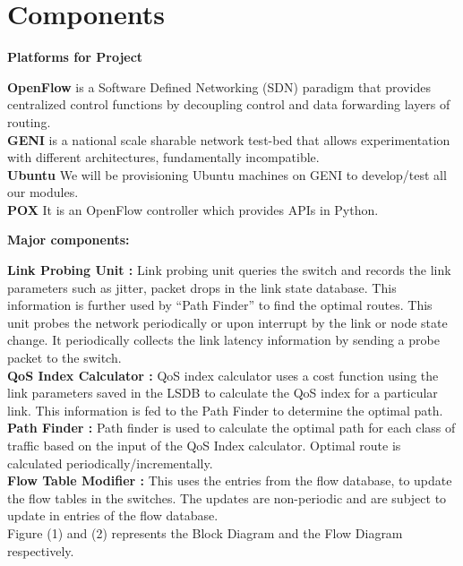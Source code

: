 \documentclass[12pt]{extarticle}
\begin{document}
\section*{Components}
{\large \textbf{Platforms for Project}}\\ 
\begin{flushleft}
\textbf{OpenFlow} is a Software Defined Networking (SDN) paradigm that provides centralized control functions by decoupling control and data forwarding layers of routing. \\
\vspace{2mm}
\textbf{GENI} is a national scale sharable network test-bed that allows experimentation with different architectures, fundamentally incompatible. \\
\vspace{2mm}
\textbf{Ubuntu} We will be provisioning Ubuntu machines on GENI to develop/test all our modules.\\
\vspace{2mm}
\textbf{POX} It is an OpenFlow controller which provides APIs in Python. \\

\end{flushleft}
\vspace{4mm}
{\large \textbf{Major components:}}\\
\begin{flushleft}
\textbf{Link Probing Unit : } Link probing unit queries the switch and records the link parameters such as jitter, packet drops in the link state database. This information is further used by “Path Finder” to find the optimal routes. This unit probes the network periodically or upon interrupt by the link or node state change. It periodically collects the link latency information by sending a probe packet to the switch.\\
\vspace{2mm}
\textbf{QoS Index Calculator :} QoS index calculator uses a cost function using the link parameters saved in the LSDB to calculate the QoS index for a particular link. This information is fed to the Path Finder to determine the optimal path.\\
\vspace{2mm}
\textbf{Path Finder :} Path finder is used to calculate the optimal path for each class of traffic based on the input of the QoS Index calculator. Optimal route is calculated periodically/incrementally.\\
\vspace{2mm}
\textbf{Flow Table Modifier :} This uses the entries from the flow database, to update the flow tables in the switches. The updates are non-periodic and are subject to update in entries of the flow database.\\
\vspace{4mm}
Figure (1) and (2) represents the Block Diagram and the Flow Diagram respectively.

\end{flushleft}
\end{document}
